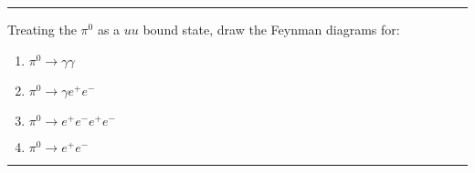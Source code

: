 \noindent\rule{7in}{1.5pt}


\begin{problem}{1.5}
Treating the $\pi^0$ as a $uu$ bound state, draw the Feynman diagrams for:
\begin{enumerate}[label=(\alph*)]
    \item $\pi^0\to\gamma\gamma$
    \item $\pi^0\to\gamma e^+e^-$
    \item $\pi^0\to e^+e^-e^+e^-$
    \item $\pi^0\to e^+e^-$
\end{enumerate}
\end{problem}
\begin{solution}

\end{solution}

\noindent\rule{7in}{1.5pt}


